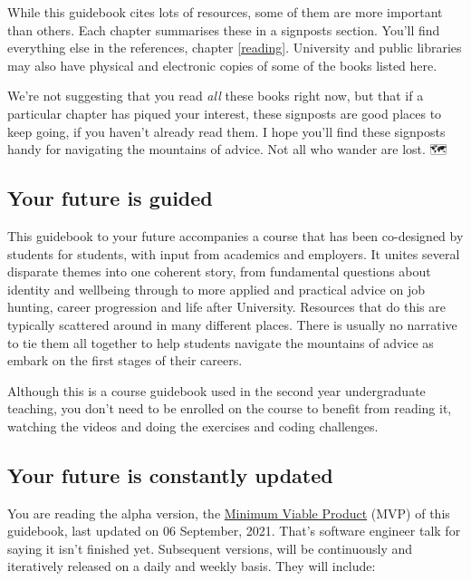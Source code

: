 \documentclass[
]{book}
\begin{document}
While this guidebook cites lots of resources, some of them are more important than others. Each chapter summarises these in a signposts section. You'll find everything else in the references, chapter \ref{reading}. University and public libraries may also have physical and electronic copies of some of the books listed here.

We're not suggesting that you read \emph{all} these books right now, but that if a particular chapter has piqued your interest, these signposts are good places to keep going, if you haven't already read them. I hope you'll find these signposts handy for navigating the mountains of advice. Not all who wander are lost. 🗺️🧭

\hypertarget{study}{%
\subsection{Your future is guided}\label{study}}

This guidebook to your future accompanies a course that has been co-designed by students for students, with input from academics and employers. It unites several disparate themes into one coherent story, from fundamental questions about identity and wellbeing through to more applied and practical advice on job hunting, career progression and life after University. Resources that do this are typically scattered around in many different places. There is usually no narrative to tie them all together to help students navigate the mountains of advice as embark on the first stages of their careers.

Although this is a course guidebook used in the second year undergraduate teaching, you don't need to be enrolled on the course to benefit from reading it, watching the videos and doing the exercises and coding challenges.

\hypertarget{version}{%
\subsection{Your future is constantly updated}\label{version}}

You are reading the alpha version, the \href{https://en.wikipedia.org/wiki/Minimum_viable_product}{Minimum Viable Product} (MVP) of this guidebook, last updated on 06 September, 2021. That's software engineer talk for saying it isn't finished yet. Subsequent versions, will be continuously and iteratively released on a daily and weekly basis. They will include:
\end{document}
